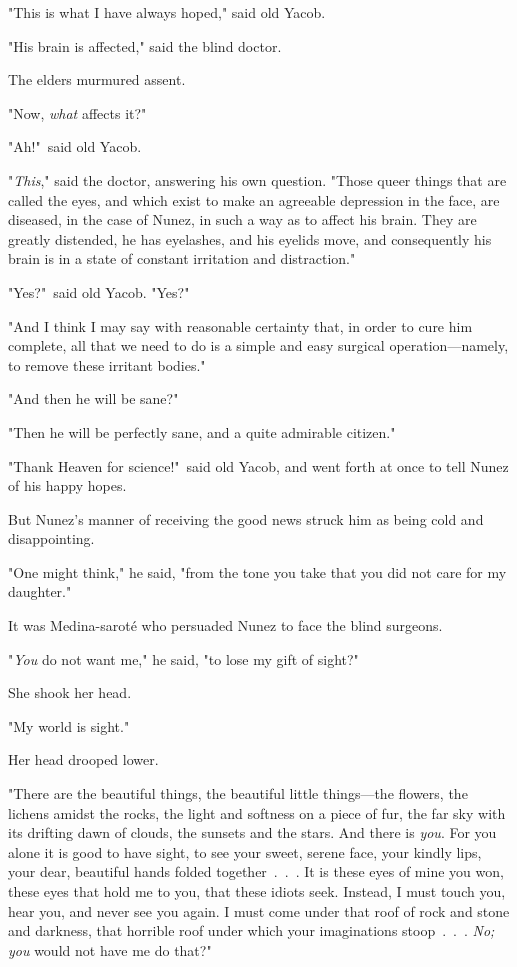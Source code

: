 \documentclass[courier]{sffms}
\begin{document}
"This is what I have always hoped," said old Yacob.

"His brain is affected," said the blind doctor.

The elders murmured assent.

"Now, \emph{what} affects it?"

"Ah!"\ said old Yacob.

"\emph{This}," said the doctor, answering his own question. "Those queer
things that are called the eyes, and which exist to make an agreeable
depression in the face, are diseased, in the case of Nunez, in such a
way as to affect his brain. They are greatly distended, he has
eyelashes, and his eyelids move, and consequently his brain is in a
state of constant irritation and distraction."

"Yes?"\ said old Yacob. "Yes?"

"And I think I may say with reasonable certainty that, in order to
cure him complete, all that we need to do is a simple and easy
surgical operation---namely, to remove these irritant bodies."

"And then he will be sane?"

"Then he will be perfectly sane, and a quite admirable citizen."

"Thank Heaven for science!"\ said old Yacob, and went forth at once to
tell Nunez of his happy hopes.

But Nunez's manner of receiving the good news struck him as being cold
and disappointing.

"One might think," he said, "from the tone you take that you did not
care for my daughter."

It was Medina-sarot\'e who persuaded Nunez to face the blind surgeons.

"\emph{You} do not want me," he said, "to lose my gift of sight?"

She shook her head.

"My world is sight."

Her head drooped lower.

"There are the beautiful things, the beautiful little things---the
flowers, the lichens amidst the rocks, the light and softness on a
piece of fur, the far sky with its drifting dawn of clouds, the
sunsets and the stars. And there is \emph{you}.  For you alone it is good to
have sight, to see your sweet, serene face, your kindly lips, your
dear, beautiful hands folded together~.~.~.  It is these eyes of
mine you won, these eyes that hold me to you, that these idiots seek.
Instead, I must touch you, hear you, and never see you again. I must
come under that roof of rock and stone and darkness, that horrible
roof under which your imaginations stoop~.~.~.  \emph{No; you} would not have
me do that?"
\end{document}
